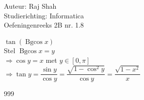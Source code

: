\documentclass[a4paper]{article}
\begin{document}
  
\noindent \large Auteur: Raj Shah \\
\noindent \large Studierichting: Informatica\\
\noindent \large Oefeningenreeks 2B nr. 1.8\\

\medskip

\normalsize

$\tan(\operatorname{Bgcos}x)$\\

Stel $\operatorname{Bgcos} x = y$ \\

$\Rightarrow \cos y = x$ met $y\in \left[0, \pi \right]$\\ 

$\Rightarrow \tan y = \dfrac{\sin y}{\cos y} = \dfrac{\sqrt{1-\cos^2y}}{\cos y} = \dfrac{\sqrt{1-x^2}}{x}$

\begin{thebibliography}{999}
\end{thebibliography}
\end{document}
